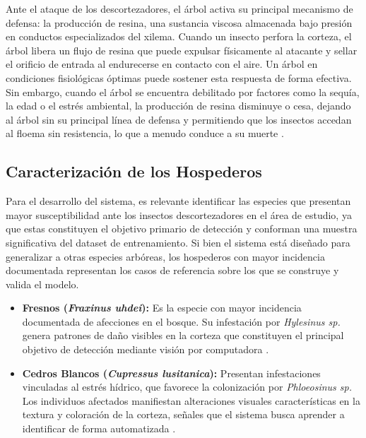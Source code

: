 Ante el ataque de los descortezadores, el árbol activa su principal mecanismo de defensa: la producción de resina, una sustancia viscosa almacenada bajo presión en conductos especializados del xilema. Cuando un insecto perfora la corteza, el árbol libera un flujo de resina que puede expulsar físicamente al atacante y sellar el orificio de entrada al endurecerse en contacto con el aire. Un árbol en condiciones fisiológicas óptimas puede sostener esta respuesta de forma efectiva. Sin embargo, cuando el árbol se encuentra debilitado por factores como la sequía, la edad o el estrés ambiental, la producción de resina disminuye o cesa, dejando al árbol sin su principal línea de defensa y permitiendo que los insectos accedan al floema sin resistencia, lo que a menudo conduce a su muerte \cite{delval_saenzromero2017descortezadores}.

\subsection{Caracterización de los Hospederos}
Para el desarrollo del sistema, es relevante identificar las especies que presentan mayor susceptibilidad ante los insectos descortezadores en el área de estudio, ya que estas constituyen el objetivo primario de detección y conforman una muestra significativa del dataset de entrenamiento. Si bien el sistema está diseñado para generalizar a otras especies arbóreas, los hospederos con mayor incidencia documentada representan los casos de referencia sobre los que se construye y valida el modelo.

\begin{itemize}
    \item \textbf{Fresnos (\textit{Fraxinus uhdei}):} Es la especie con mayor incidencia documentada de afecciones en el bosque. Su infestación por \textit{Hylesinus sp.} genera patrones de daño visibles en la corteza que constituyen el principal objetivo de detección mediante visión por computadora 
    \cite{resendiz2019salud}.

    \item \textbf{Cedros Blancos (\textit{Cupressus lusitanica}):} Presentan infestaciones vinculadas al estrés hídrico, que favorece la colonización por \textit{Phloeosinus sp.} Los individuos afectados manifiestan alteraciones visuales características en la textura y coloración de la corteza, señales que el sistema busca aprender a identificar de forma automatizada \cite{resendiz2019salud}.
\end{itemize}



